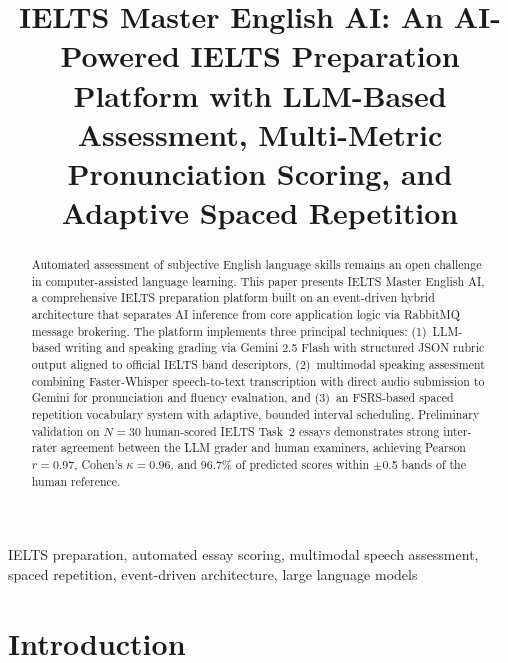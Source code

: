 \documentclass[conference]{IEEEtran}
\begin{document}
\title{IELTS Master English AI: An AI-Powered IELTS Preparation Platform with LLM-Based Assessment, Multi-Metric Pronunciation Scoring, and Adaptive Spaced Repetition}

\author{
}

\maketitle


\begin{abstract}
Automated assessment of subjective English language skills remains an open challenge in computer-assisted language learning. This paper presents IELTS Master English AI, a comprehensive IELTS preparation platform built on an event-driven hybrid architecture that separates AI inference from core application logic via RabbitMQ message brokering. The platform implements three principal techniques: (1)~LLM-based writing and speaking grading via Gemini 2.5 Flash with structured JSON rubric output aligned to official IELTS band descriptors, (2)~multimodal speaking assessment combining Faster-Whisper speech-to-text transcription with direct audio submission to Gemini for pronunciation and fluency evaluation, and (3)~an FSRS-based spaced repetition vocabulary system with adaptive, bounded interval scheduling. Preliminary validation on $N=30$ human-scored IELTS Task~2 essays demonstrates strong inter-rater agreement between the LLM grader and human examiners, achieving Pearson $r=0.97$, Cohen's $\kappa=0.96$, and 96.7\% of predicted scores within $\pm$0.5 bands of the human reference.
\end{abstract}

\begin{IEEEkeywords}
IELTS preparation, automated essay scoring, multimodal speech assessment, spaced repetition, event-driven architecture, large language models
\end{IEEEkeywords}

\section{Introduction}
\end{document}

